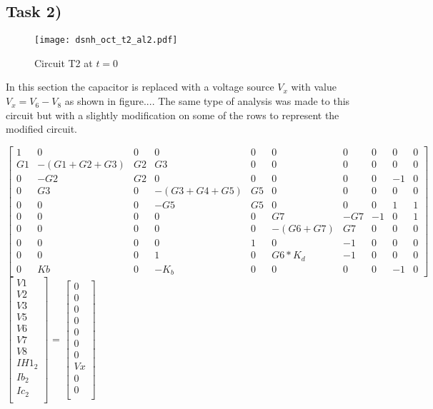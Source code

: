 \subsection{Task 2)}
\label{subsec:task2_a}

\begin{figure}[H]
	\centering
	\texttt{[image: dsnh\_oct\_t2\_al2.pdf]}
	\caption{Circuit T2 at $t=0$}
\label{fig:Dsnh_sim_t2}
\end{figure}

In this section the capacitor is replaced with a voltage source $V_x$ with value $V_x = V_6 - V_8$ as shown in figure.... The same type of analysis was made to this circuit but with a slightly modification on some of the rows to represent the modified circuit.

{\footnotesize

$ \begin{bmatrix}
1 & 0 & 0 & 0 & 0 & 0 & 0 & 0 & 0 & 0 \\
G1 & -(G1+G2+G3) & G2 & G3 & 0 & 0 & 0 & 0 & 0 & 0 \\
0 & -G2 & G2 & 0 & 0 & 0 & 0 & 0 & -1 & 0 \\
0 & G3 & 0 & -(G3+G4+G5) & G5 & 0 & 0 & 0 & 0 & 0 \\
0 & 0 & 0 & -G5 & G5 & 0 & 0 & 0 & 1 & 1 \\
0 & 0 & 0 & 0 & 0 & G7 & -G7 & -1 & 0 & 1 \\
0 & 0 & 0 & 0 & 0 & -(G6+G7) & G7 & 0 & 0 & 0 \\
0 & 0 & 0 & 0 & 1 & 0 & -1 & 0 & 0 & 0 \\
0 & 0 & 0 & 1 & 0 & G6*K_d & -1 & 0 & 0 & 0 \\
0 & Kb & 0 & -K_b & 0 & 0 & 0 & 0 & -1 & 0 
\end{bmatrix}  $
$ \begin{bmatrix}
V1 \\
V2 \\
V3 \\
V5 \\
V6 \\
V7 \\
V8 \\
IH1_2 \\
Ib_2 \\
Ic_2 \\
\end{bmatrix}  $
=
$ \begin{bmatrix}
0 \\
0 \\
0 \\
0 \\
0 \\
0 \\
0 \\
Vx \\
0 \\
0 \\
\end{bmatrix}  $
}



